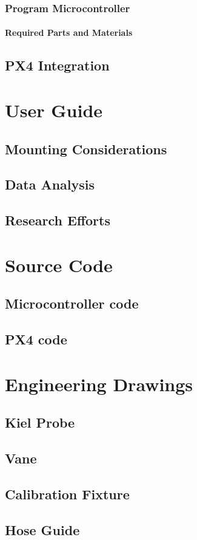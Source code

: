 \documentclass[10pt,onecolumn]{article}
\begin{document}
		\subsubsection{Program Microcontroller}
		
			\paragraph{Required Parts and Materials}
	
	\subsection{PX4 Integration}

\section{User Guide}

	\subsection{Mounting Considerations}
	
	\subsection{Data Analysis}
	
	\subsection{Research Efforts}

\appendix
\section{Source Code}

	\subsection{Microcontroller code}
	
	\subsection{PX4 code}

\section{Engineering Drawings}

	\subsection{Kiel Probe}
	
	\subsection{Vane}
	
	\subsection{Calibration Fixture}
	
	\subsection{Hose Guide}
	
\end{document}
